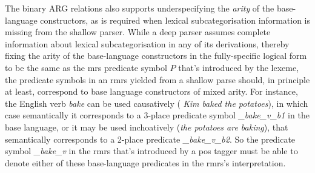 The binary ARG relations also supports underspecifying the {\em arity}
of the base-language constructors, as is required when lexical
subcategorisation information is missing from the shallow parser.
While a deep parser assumes complete information about lexical
subcategorisation in any of its derivations, thereby fixing the arity
of the base-language constructors in the fully-specific logical form
to be the same as the {\sc mrs} predicate symbol $P$ that's introduced by
the lexeme, the predicate symbols in an {\sc rmrs} yielded from a
shallow parse should, in principle at least,
correspond to base language constructors of mixed arity.  For
instance, the English verb {\em bake} can be used causatively ({\em
  Kim baked the potatoes}), in which case semantically it corresponds
to a 3-place predicate symbol {\em \_bake\_v\_b1} in the base
language, or it may be used 
inchoatively ({\em the potatoes are baking}), that semantically
corresponds to a 2-place predicate {\em \_bake\_v\_b2}.  So the 
predicate symbol {\em 
  \_bake\_v} in the {\sc rmrs} that's introduced by a {\sc pos} tagger
must be able to denote either of these
base-language predicates in the {\sc rmrs}'s interpretation.



